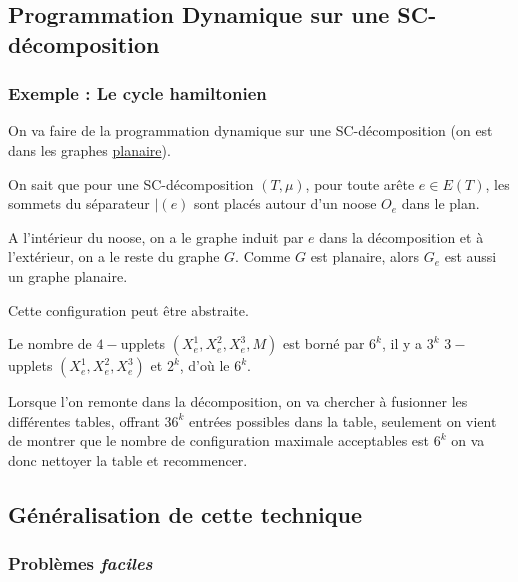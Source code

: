 \documentclass[a4paper, 11pt]{thesis}
\begin{document}
\subsection{Programmation Dynamique sur une SC-décomposition}


\subsubsection{Exemple : Le cycle hamiltonien}


On va faire de la programmation dynamique sur une SC-décomposition (on est dans les graphes
\underline{planaire}).

On sait que pour une SC-décomposition $(T, \mu)$, pour toute arête $e \in E(T)$, les sommets du
séparateur $\mid(e)$ sont placés autour d'un noose $O_e$ dans le plan.


A l'intérieur du noose, on a le graphe induit par $e$ dans la décomposition et à l'extérieur, on a
le reste du graphe $G$. Comme $G$ est planaire, alors $G_e$ est aussi un graphe planaire.

Cette configuration peut être abstraite. %


Le nombre de $4-$upplets $(X_e^1, X_e^2, X_e^3, M)$ est borné par $6^k$, il y a $3^k$ $3-$upplets
$(X_e^1, X_e^2, X_e^3)$ et $2^k$, d'où le $6^k$.

Lorsque l'on remonte dans la décomposition, on va chercher à fusionner les différentes tables,
offrant $36^k$ entrées possibles dans la table, seulement on vient de montrer que le nombre de
configuration maximale acceptables est $6^k$ on va donc nettoyer la table et recommencer.


\subsection{Généralisation de cette technique}

\subsubsection{Problèmes \emph{faciles}}
\end{document}
